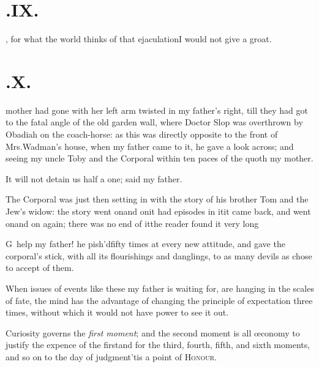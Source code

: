 \documentclass{article}
\begin{document}
\vfill{}\eject
\null{}\baselineskip
\section{.\enspace IX.}

, for what the world thinks of
that ejaculation\tsh I would not give a groat.

\vfill{}\eject
\null{}\baselineskip
\section{.\enspace X.}

 mother had gone with her left arm twisted in my father’s right, till
they had got to the fatal angle of the old garden wall, where Doctor Slop was
overthrown by Obadiah on the coach-horse: as this was directly opposite to the front
of Mrs.\@ Wadman’s house, when my father came to it, he gave a look across; and
seeing my uncle Toby and the Corporal within ten paces of the\break
{}
quoth my mother.

\tsh It will not detain us half a one; said my
father.

The Corporal was just then setting in with the story of his brother Tom and the
Jew’s widow: the story went on\tsk\break and on\tsh it had episodes in it\tsh\break it came
back, and went on\tsh and on again; there was no end of it\tsh the reader found it
very long\tsh

\tsh G\tsk\, help my father! he pish’d\break fifty
times at every new attitude, and gave the corporal’s stick,
with all its flourishings and danglings, to as many devils as chose
to accept of them.

When issues of events like these my father is waiting for, are
hanging in the scales of fate, the mind has the advantage of
changing the principle of expectation three times, without which it
would not have power to see it out.

Curiosity governs the \textit{first moment}; and the second moment is all œconomy to
justify the expence of the first\tsh\break and for the third, fourth, fifth, and
sixth moments, and so on to the day of judgment\tsk ’tis a point of \textsc{Honour}.
\end{document}
